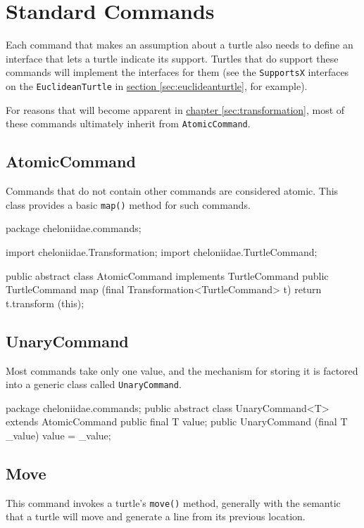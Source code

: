 \documentclass{report}
\newcommand{\Ref}[2]{\hyperref[#2]{#1 \ref*{#2}}}
\begin{document}
\section {Standard Commands} \label{sec:standard-commands}
      Each command that makes an assumption about a turtle also needs to define an interface that lets a turtle indicate its support. Turtles that do support
      these commands will implement the interfaces for them (see the {\tt SupportsX} interfaces on the {\tt EuclideanTurtle} in
      \Ref{section}{sec:euclideanturtle}, for example).

      For reasons that will become apparent in \Ref{chapter}{sec:transformation}, most of these commands ultimately inherit from {\tt AtomicCommand}.

\subsection {AtomicCommand} \label{sec:atomiccommand}
        Commands that do not contain other commands are considered atomic. This class provides a basic {\tt map()} method for such commands.

\begin{javacode}
package cheloniidae.commands;

import cheloniidae.Transformation;
import cheloniidae.TurtleCommand;

public abstract class AtomicCommand implements TurtleCommand {
  public TurtleCommand map (final Transformation<TurtleCommand> t) {return t.transform (this);}
}
\end{javacode}

\subsection {UnaryCommand} \label{sec:unarycommand}
        Most commands take only one value, and the mechanism for storing it is factored into a generic class called {\tt UnaryCommand}.

\begin{javacode}
package cheloniidae.commands;
public abstract class UnaryCommand<T> extends AtomicCommand {
  public final T value;
  public UnaryCommand (final T _value) {value = _value;}
}
\end{javacode}

\subsection {Move} \label{sec:move}
        This command invokes a turtle's {\tt move()} method, generally with the semantic that a turtle will move and generate a line from its previous location.
\end{document}
